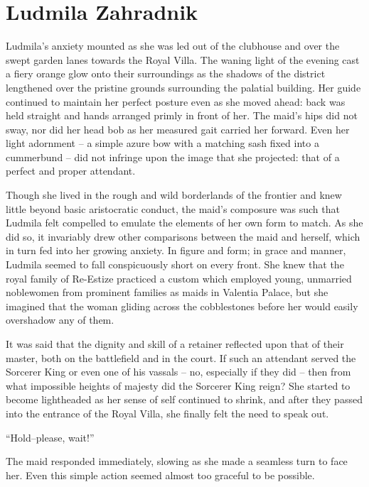 
\chapter{Ludmila Zahradnik}

Ludmila’s anxiety mounted as she was led out of the clubhouse and over the swept garden lanes towards the Royal Villa. The waning light of the evening cast a fiery orange glow onto their surroundings as the shadows of the district lengthened over the pristine grounds surrounding the palatial building. Her guide continued to maintain her perfect posture even as she moved ahead: back was held straight and hands arranged primly in front of her. The maid’s hips did not sway, nor did her head bob as her measured gait carried her forward. Even her light adornment – a simple azure bow with a matching sash fixed into a cummerbund – did not infringe upon the image that she projected: that of a perfect and proper attendant.

 

Though she lived in the rough and wild borderlands of the frontier and knew little beyond basic aristocratic conduct, the maid’s composure was such that Ludmila felt compelled to emulate the elements of her own form to match. As she did so, it invariably drew other comparisons between the maid and herself, which in turn fed into her growing anxiety. In figure and form; in grace and manner, Ludmila seemed to fall conspicuously short on every front. She knew that the royal family of Re-Estize practiced a custom which employed young, unmarried noblewomen from prominent families as maids in Valentia Palace, but she imagined that the woman gliding across the cobblestones before her would easily overshadow any of them.

 

It was said that the dignity and skill of a retainer reflected upon that of their master, both on the battlefield and in the court. If such an attendant served the Sorcerer King or even one of his vassals – no, especially if they did – then from what impossible heights of majesty did the Sorcerer King reign? She started to become lightheaded as her sense of self continued to shrink, and after they passed into the entrance of the Royal Villa, she finally felt the need to speak out.

 

“Hold–please, wait!”

 

The maid responded immediately, slowing as she made a seamless turn to face her. Even this simple action seemed almost too graceful to be possible.

